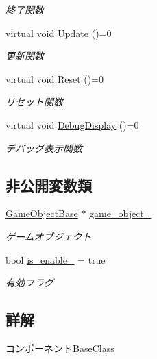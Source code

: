 \begin{DoxyCompactItemize}
\begin{DoxyCompactList}\small\item\em 終了関数 \end{DoxyCompactList}\item 
virtual void \mbox{\hyperlink{class_component_base_a58e66d65bc8f3cd5ab67b4b2deab4fc2}{Update}} ()=0
\begin{DoxyCompactList}\small\item\em 更新関数 \end{DoxyCompactList}\item 
virtual void \mbox{\hyperlink{class_component_base_a484df9edcbe83b1a98aacc55b50bfdda}{Reset}} ()=0
\begin{DoxyCompactList}\small\item\em リセット関数 \end{DoxyCompactList}\item 
virtual void \mbox{\hyperlink{class_component_base_a36ae7d27ad9d756fa245bad443020407}{Debug\+Display}} ()=0
\begin{DoxyCompactList}\small\item\em デバッグ表示関数 \end{DoxyCompactList}\end{DoxyCompactItemize}
\subsection*{非公開変数類}
\begin{DoxyCompactItemize}
\item 
\mbox{\hyperlink{class_game_object_base}{Game\+Object\+Base}} $\ast$ \mbox{\hyperlink{class_component_base_a60a43b42437cd5be2b05d2f4f4dd8147}{game\+\_\+object\+\_\+}}
\begin{DoxyCompactList}\small\item\em ゲームオブジェクト \end{DoxyCompactList}\item 
bool \mbox{\hyperlink{class_component_base_a699404ac57307462ca82a28312fcc439}{is\+\_\+enable\+\_\+}} = true
\begin{DoxyCompactList}\small\item\em 有効フラグ \end{DoxyCompactList}\end{DoxyCompactItemize}


\subsection{詳解}
コンポーネント\+Base\+Class 

